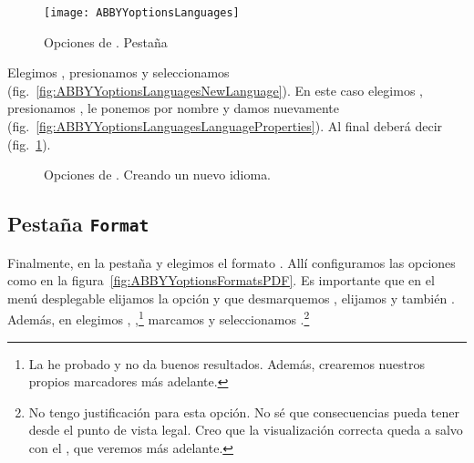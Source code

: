 \documentclass[%
	a5paper,
	10pt,
	twoside,
	openright,
	final,
]{memoir}
\begin{document}
{	\begin{figure}
		\centering
		\texttt{[image: ABBYYoptionsLanguages]}
		\caption[Opciones de \abbyy. Pestaña \texttt{Languages}]{Opciones de \abbyy. Pestaña \label{fig:ABBYYoptionsLanguages}}
	\end{figure}

	Elegimos , presionamos  y seleccionamos  (fig.~\ref{fig:ABBYYoptionsLanguagesNewLanguage}). En este caso elegimos , presionamos , le ponemos por nombre  y damos  nuevamente (fig.~\ref{fig:ABBYYoptionsLanguagesLanguageProperties}). Al final deberá decir  (fig.~\ref{fig:ABBYYoptionsLanguages}).

	\begin{figure}
		\centering
		\caption{Opciones de \abbyy. Creando un nuevo idioma.}
	\end{figure}

	\subsection{Pestaña \texttt{Format}} Finalmente, en la pestaña  y elegimos el formato . Allí configuramos las opciones como en la figura~\ref{fig:ABBYYoptionsFormatsPDF}. Es importante que en el menú desplegable  elijamos la opción  y que desmarquemos , elijamos  y también . Además, en  elegimos , ,\footnote{La he probado y no da buenos resultados. Además, crearemos nuestros propios marcadores más adelante.} marcamos  y seleccionamos .\footnote{No tengo justificación para esta opción. No sé que consecuencias pueda tener desde el punto de vista legal. Creo que la visualización correcta queda a salvo con el \pdfa, que veremos más adelante.}

}
\end{document}
